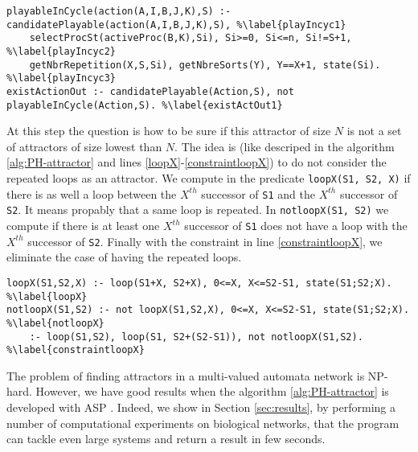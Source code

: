 \begin{lstlisting}
playableInCycle(action(A,I,B,J,K),S) :- candidatePlayable(action(A,I,B,J,K),S), %\label{playIncyc1}
	selectProcSt(activeProc(B,K),Si), Si>=0, Si<=n, Si!=S+1, %\label{playIncyc2}
	getNbrRepetition(X,S,Si), getNbreSorts(Y), Y==X+1, state(Si). %\label{playIncyc3}
existActionOut :- candidatePlayable(Action,S), not playableInCycle(Action,S). %\label{existActOut1}
\end{lstlisting}

At this step the question is how to be sure if this attractor of size $N$ is not a set of attractors of size lowest than $N$. The idea is (like descriped in the algorithm \ref{alg:PH-attractor} and lines \ref{loopX}-\ref{constraintloopX}) to do not consider the repeated loops as an attractor. We compute in the predicate \texttt{loopX(S1, S2, X)} if there is as well a loop between the $X^{th}$ successor of \texttt{S1} and the $X^{th}$ successor of \texttt{S2}. It means propably  that a same loop is repeated. In \texttt{notloopX(S1, S2)} we compute if there is at least one $X^{th}$ successor of \texttt{S1} does not have a loop with the $X^{th}$ successor of \texttt{S2}. Finally with the constraint in line \ref{constraintloopX}, we eliminate the case of having the repeated loops.

\begin{lstlisting}
loopX(S1,S2,X) :- loop(S1+X, S2+X), 0<=X, X<=S2-S1, state(S1;S2;X). %\label{loopX}
notloopX(S1,S2) :- not loopX(S1,S2,X), 0<=X, X<=S2-S1, state(S1;S2;X). %\label{notloopX}
 	:- loop(S1,S2), loop(S1, S2+(S2-S1)), not notloopX(S1,S2). %\label{constraintloopX}
\end{lstlisting}

The problem of finding attractors in a multi-valued automata network is NP-hard. However, we have good results when the algorithm \ref{alg:PH-attractor} is developed with ASP . Indeed, we show in Section \ref{sec:results}, by performing a number of computational experiments on biological networks, that the program can tackle even large systems and return a result in few seconds.

%
%
